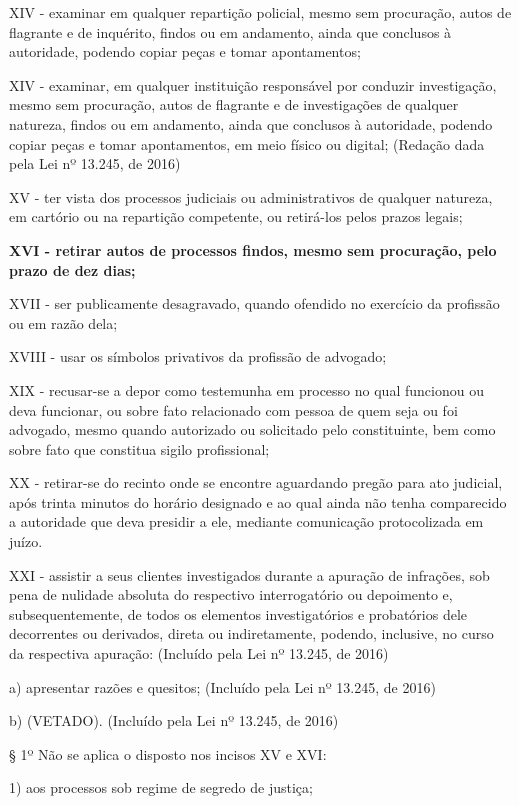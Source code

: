 \documentclass[12pt]{article}
\begin{document}
XIV - examinar em qualquer repartição policial, mesmo sem procuração, autos de flagrante e de inquérito, findos ou em andamento, ainda que conclusos à autoridade, podendo copiar peças e tomar apontamentos;

XIV - examinar, em qualquer instituição responsável por conduzir investigação, mesmo sem procuração, autos de flagrante e de investigações de qualquer natureza, findos ou em andamento, ainda que conclusos à autoridade, podendo copiar peças e tomar apontamentos, em meio físico ou digital;         (Redação dada pela Lei nº 13.245, de 2016)

XV - ter vista dos processos judiciais ou administrativos de qualquer natureza, em cartório ou na repartição competente, ou retirá-los pelos prazos legais;

\textbf{XVI - retirar autos de processos findos, mesmo sem procuração, pelo prazo de dez dias;}

XVII - ser publicamente desagravado, quando ofendido no exercício da profissão ou em razão dela;

XVIII - usar os símbolos privativos da profissão de advogado;

XIX - recusar-se a depor como testemunha em processo no qual funcionou ou deva funcionar, ou sobre fato relacionado com pessoa de quem seja ou foi advogado, mesmo quando autorizado ou solicitado pelo constituinte, bem como sobre fato que constitua sigilo profissional;

XX - retirar-se do recinto onde se encontre aguardando pregão para ato judicial, após trinta minutos do horário designado e ao qual ainda não tenha comparecido a autoridade que deva presidir a ele, mediante comunicação protocolizada em juízo.

XXI - assistir a seus clientes investigados durante a apuração de infrações, sob pena de nulidade absoluta do respectivo interrogatório ou depoimento e, subsequentemente, de todos os elementos investigatórios e probatórios dele decorrentes ou derivados, direta ou indiretamente, podendo, inclusive, no curso da respectiva apuração:         (Incluído pela Lei nº 13.245, de 2016)

a) apresentar razões e quesitos;         (Incluído pela Lei nº 13.245, de 2016)

b) (VETADO).         (Incluído pela Lei nº 13.245, de 2016)

§ 1º Não se aplica o disposto nos incisos XV e XVI:

1) aos processos sob regime de segredo de justiça;
\end{document}
